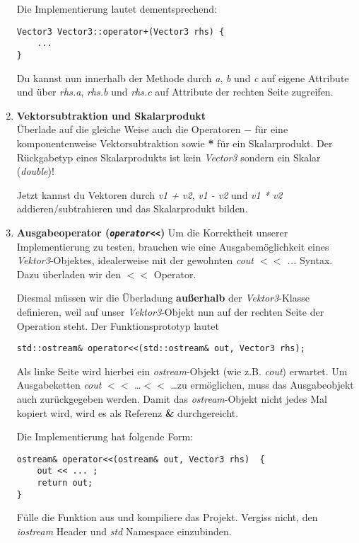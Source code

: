 \begin{enumerate}
Die Implementierung lautet dementsprechend:
\begin{lstlisting}
Vector3 Vector3::operator+(Vector3 rhs) {
	...
}
\end{lstlisting}

Du kannst nun innerhalb der Methode durch \emph{a}, \emph{b} und \emph{c} auf eigene Attribute und über  \emph{rhs.a}, \emph{rhs.b} und \emph{rhs.c} auf Attribute der rechten Seite zugreifen.

\item\textbf{Vektorsubtraktion und Skalarprodukt}\\[0ex]
Überlade auf die gleiche Weise auch die Operatoren $-$ für eine komponentenweise Vektorsubtraktion sowie \textbf{*} für ein Skalarprodukt.
Der Rückgabetyp eines Skalarprodukts ist kein \emph{Vector3} sondern ein Skalar (\emph{double})!

Jetzt kannst du Vektoren durch \emph{v1 + v2}, \emph{v1 - v2} und \emph{v1 * v2} addieren/subtrahieren und das Skalarprodukt bilden.

\item\textbf{Ausgabeoperator (\emph{\texttt{operator<<}})}
Um die Korrektheit unserer Implementierung zu testen, brauchen wie eine Ausgabemöglichkeit eines \emph{Vektor3}-Objektes, idealerweise mit der gewohnten \emph{cout \textbf{$<<$} ...} Syntax.
Dazu überladen wir den \textbf{$<<$} Operator.

Diesmal müssen wir die Überladung \textbf{außerhalb} der \emph{Vektor3}-Klasse definieren, weil auf unser \emph{Vektor3}-Objekt nun auf der rechten Seite der Operation steht. Der Funktionsprototyp lautet 
\begin{lstlisting}
std::ostream& operator<<(std::ostream& out, Vector3 rhs);
\end{lstlisting}

Als linke Seite wird hierbei ein \emph{ostream}-Objekt (wie z.B. \emph{cout}) erwartet.
Um Ausgabeketten \emph{cout} \textbf{$<<$} \dots \textbf{$<<$} \dots zu ermöglichen, muss das Ausgabeobjekt auch zurückgegeben werden. Damit das \emph{ostream}-Objekt nicht jedes Mal kopiert wird, wird es als Referenz \textbf{\&} durchgereicht.

Die Implementierung hat folgende Form:
\begin{lstlisting}
ostream& operator<<(ostream& out, Vector3 rhs)  {
	out << ... ;
	return out;
}
\end{lstlisting}

Fülle die Funktion aus und kompiliere das Projekt.
Vergiss nicht, den \emph{iostream} Header und \emph{std} Namespace einzubinden.


\end{enumerate}
